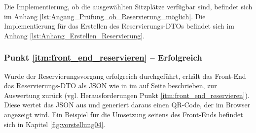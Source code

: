 Die Implementierung, ob die ausgewählten Sitzplätze verfügbar sind, befindet sich im Anhang \vref{lst:Angang_Prüfung_ob_Reservierung_möglich}.
Die Implementierung für das Erstellen des Reservierungs-\acp{DTO} befindet sich im Anhang \vref{lst:Anhang_Erstellen_Reservierung}.

\subsubsection*{Punkt \ref{itm:front_end_reservieren} -- Erfolgreich}
\label{ssssec:front_end_reservieren}
Wurde der Reservierungsvorgang erfolgreich durchgeführt, erhält das Front-End das Reservierungs-\acs{DTO} als \acs{JSON} wie in  im  auf Seite \pageref{ssssec:erfolgreich_blocken} beschrieben, zur Auswertung zurück (vgl. Herausforderungen Punkt \vref{itm:front_end_reservieren}).
Diese wertet das \acs{JSON} aus und generiert daraus einen \acs{QR-Code}, der im Browser angezeigt wird.
Ein Beispiel für die Umsetzung seitens des Front-Ends befindet sich in Kapitel \vref{fig:vorstellung04}.
